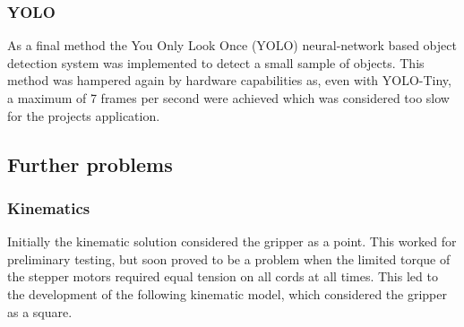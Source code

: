 \documentclass[conference]{IEEEtran}
\begin{document}
\subsubsection{YOLO}
As a final method the You Only Look Once (YOLO) neural-network based object detection system was implemented to detect a small sample of objects. This method was hampered again by hardware capabilities as, even with YOLO-Tiny, a maximum of 7 frames per second were achieved which was considered too slow for the projects application.\subsection{Further problems}\subsubsection{Kinematics}\label{kinematic_solution_3}
Initially the kinematic solution considered the gripper as a point. This worked for preliminary testing, but soon proved to be a problem when the limited torque of the stepper motors required equal tension on all cords at all times. This led to the development of the following kinematic model, which considered the gripper as a square. 
\end{document}
